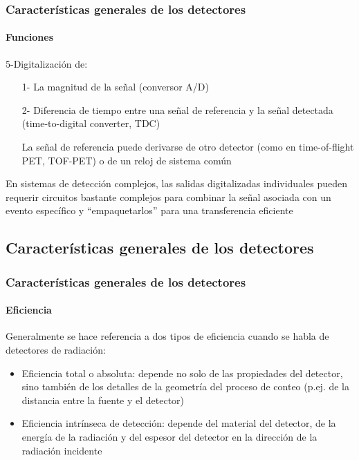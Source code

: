 \documentclass{beamer}
\begin{document}
\begin{frame}
\frametitle{Características generales de los detectores}
\framesubtitle{{\color{blue}Funciones}}
\begin{block}{5-Digitalización de:}
\begin{itemize}
\item[1-] {\color[rgb]{0.5,0,0.13}\small{La magnitud de la señal (conversor
A/D)}}

\item[2-] {\color[rgb]{0.5,0,0.13}\small{Diferencia de tiempo entre una señal de
referencia y la señal detectada (time-to-digital converter, TDC)}}

\small{La señal de referencia puede derivarse de otro detector (como en time-of-flight
PET, TOF-PET) o de un reloj de sistema común}

\end{itemize}
\end{block}

\begin{exampleblock}{}
{\color[rgb]{0.5,0,0.13}\small{En sistemas de detección complejos, las salidas
digitalizadas individuales pueden requerir circuitos bastante complejos para
combinar la señal asociada con un evento específico y ``empaquetarlos'' para una
transferencia eficiente}}
\end{exampleblock}
\end{frame} 

\subsection{Características generales de los detectores}

\begin{frame}
\frametitle{Características generales de los detectores}
\framesubtitle{{\color{blue}Eficiencia}}
\begin{exampleblock}{}
Generalmente se hace referencia a dos tipos de eficiencia cuando se habla de
detectores de radiación:
\begin{itemize}
\item {\color{blue}Eficiencia total o absoluta}: depende no solo de las propiedades del
detector, sino también de los detalles de la geometría del proceso de conteo
(p.ej. de la distancia entre la fuente y el detector)
\item {\color{blue}Eficiencia intrínseca de detección}: depende del material del
detector, de la energía de la radiación y del espesor del detector en la
dirección de la radiación incidente 
\end{itemize}
\end{exampleblock}
\end{frame} 
\end{document}
